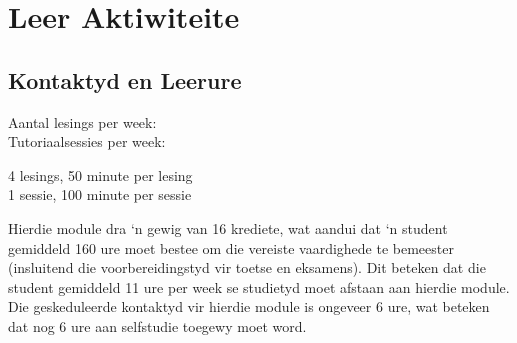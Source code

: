 \section{Leer Aktiwiteite}
    \subsection{Kontaktyd en Leerure}
        \begin{minipage}{0.4\linewidth}
            Aantal lesings per week: \\
            Tutoriaalsessies per week:
        \end{minipage}
        \begin{minipage}{0.4\linewidth}
            4 lesings, 50 minute per lesing \\
            1 sessie, 100 minute per sessie
        \end{minipage}

        Hierdie module dra `n gewig van 16 krediete, wat aandui dat `n student
        gemiddeld 160 ure moet bestee om die vereiste vaardighede te bemeester
        (insluitend die voorbereidingstyd vir toetse en eksamens). Dit beteken
        dat die student gemiddeld 11 ure per week se studietyd moet afstaan aan
        hierdie module. Die geskeduleerde kontaktyd vir hierdie module is
        ongeveer 6 ure, wat beteken dat nog 6 ure aan selfstudie toegewy moet
        word.

